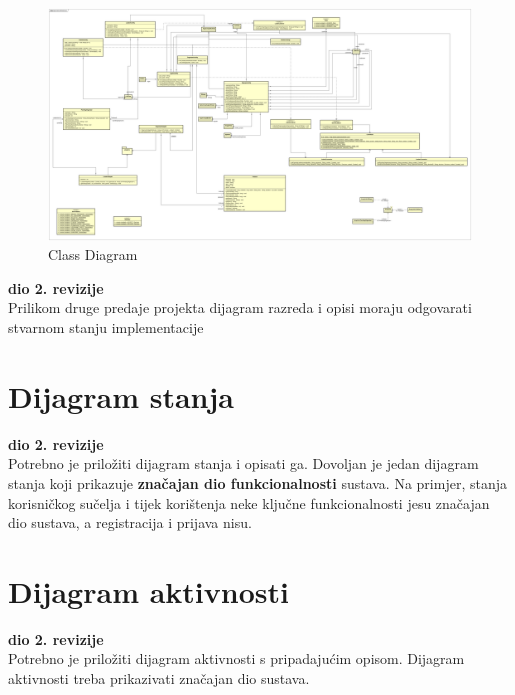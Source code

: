 			\begin{figure}[H]
				\includegraphics[width=\linewidth]{diagrams/UML-OrganizationOfTheFestival_v1.png}
				\caption{Class Diagram}
				\label{fig:class_diag}
			\end{figure}
			
			\textbf{ dio 2. revizije}\\			
			
			 Prilikom druge predaje projekta dijagram razreda i opisi moraju odgovarati stvarnom stanju implementacije
			
			
			
			\eject
		
		\section{Dijagram stanja}
			
			
			\textbf{ dio 2. revizije}\\
			
			 Potrebno je priložiti dijagram stanja i opisati ga. Dovoljan je jedan dijagram stanja koji prikazuje \textbf{značajan dio funkcionalnosti} sustava. Na primjer, stanja korisničkog sučelja i tijek korištenja neke ključne funkcionalnosti jesu značajan dio sustava, a registracija i prijava nisu. 
			
			
			\eject 
		
		\section{Dijagram aktivnosti}
			
			\textbf{ dio 2. revizije}\\
			
			  Potrebno je priložiti dijagram aktivnosti s pripadajućim opisom. Dijagram aktivnosti treba prikazivati značajan dio sustava.
			
